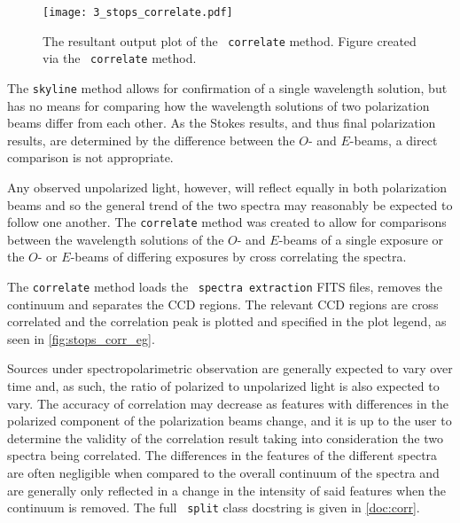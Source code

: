 

\begin{figure}[t]
    \centering
    \texttt{[image: 3\_stops\_correlate.pdf]}
    \caption{The resultant output plot of the \stops\ \texttt{correlate} method. Figure created via the \stops\ \texttt{correlate} method.}
    \label{fig:stops_corr_eg}
\end{figure}

The \texttt{skyline} method allows for confirmation of a single wavelength solution, but has no means for comparing how the wavelength solutions of two polarization beams differ from each other. As the Stokes results, and thus final polarization results, are determined by the difference between the $O$- and $E$-beams, a direct comparison is not appropriate.

Any observed unpolarized light, however, will reflect equally in both polarization beams and so the general trend of the two spectra may reasonably be expected to follow one another. The \texttt{correlate} method was created to allow for comparisons between the wavelength solutions of the $O$- and $E$-beams of a single exposure or the $O$- or $E$-beams of differing exposures by cross correlating the spectra.

The \texttt{correlate} method loads the \polsalt\ \texttt{spectra extraction} \gls{FITS} files, removes the continuum and separates the \gls{CCD} regions. The relevant \gls{CCD} regions are cross correlated and the correlation peak is plotted and specified in the plot legend, as seen in \autoref{fig:stops_corr_eg}.

Sources under spectropolarimetric observation are generally expected to vary over time and, as such, the ratio of polarized to unpolarized light is also expected to vary. The accuracy of correlation may decrease as features with differences in the polarized component of the polarization beams change, and it is up to the user to determine the validity of the correlation result taking into consideration the two spectra being correlated. The differences in the features of the different spectra are often negligible when compared to the overall continuum of the spectra and are generally only reflected in a change in the intensity of said features when the continuum is removed.
The full \stops\ \texttt{split} class docstring is given in \autoref{doc:corr}.

